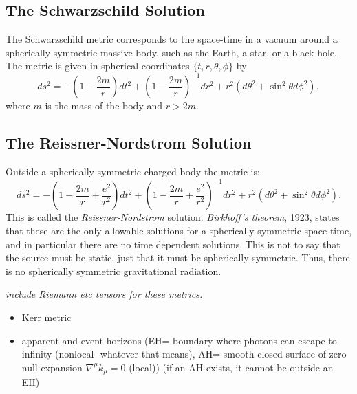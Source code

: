 \subsection{The Schwarzschild Solution}
The Schwarzschild metric corresponds to the space-time in a vacuum around a spherically symmetric massive body, such as the Earth, a star, or a black hole. The metric is given in spherical coordinates $\{t,r,\theta,\phi\}$ by
\begin{equation} d s^2 = -\left(1-\frac{2m}{r}\right)d t^2+\left(1-\frac{2m}{r}\right)^{-1}d r^2 + r^2(d \theta^2 + \sin^2 \theta d \phi^2), \label{Schwarzschild} \end{equation}
where $m$ is the mass of the body and $r>2m$. 



\subsection{The Reissner-Nordstrom Solution}
Outside a spherically symmetric charged body the metric is:
\begin{equation} d s^2 = -\left(1-\frac{2m}{r} + \frac{e^2}{r^2}\right)d t^2+\left(1-\frac{2m}{r}+\frac{e^2}{r^2}\right)^{-1}d r^2 + r^2(d \theta^2 + \sin^2 \theta d \phi^2). \label{eq:R-N}
\end{equation}
This is called the \textit{Reissner-Nordstrom} solution. \textit{Birkhoff's theorem}, 1923, states that these are the only allowable solutions for a spherically symmetric space-time, and in particular there are no time dependent solutions. This is not to say that the source must be static, just that it must be spherically symmetric. Thus, there is no spherically symmetric gravitational radiation. 

\textit{include Riemann etc tensors for these metrics.}

\begin{itemize}
\item Kerr metric
\item apparent and event horizons (EH= boundary where photons can escape to infinity (nonlocal- whatever that means), AH= smooth closed surface of zero null expansion $\nabla^\mu k_\mu =0$ (local)) (if an AH exists, it cannot be outside an EH)
\end{itemize}


